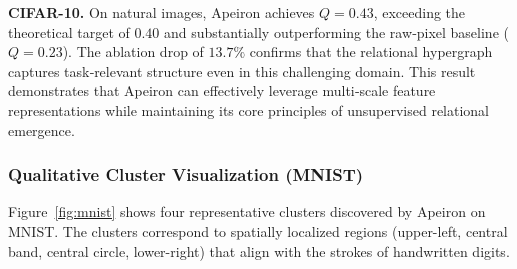 \textbf{CIFAR-10.} On natural images, Apeiron achieves $Q = 0.43$, exceeding the theoretical target of $0.40$ and substantially outperforming the raw‑pixel baseline ($Q=0.23$). The ablation drop of $13.7\%$ confirms that the relational hypergraph captures task‑relevant structure even in this challenging domain. This result demonstrates that Apeiron can effectively leverage multi‑scale feature representations while maintaining its core principles of unsupervised relational emergence.

\subsubsection{Qualitative Cluster Visualization (MNIST)}

Figure~\ref{fig:mnist} shows four representative clusters discovered by Apeiron on MNIST. The clusters correspond to spatially localized regions (upper-left, central band, central circle, lower-right) that align with the strokes of handwritten digits.

